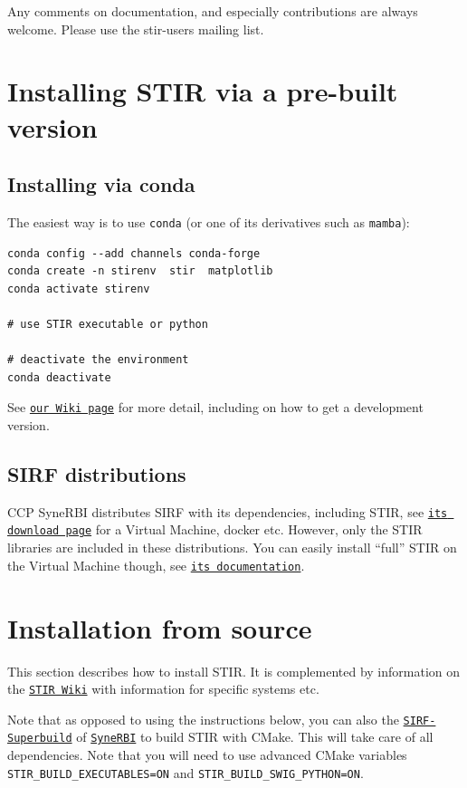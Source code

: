 \documentclass{article}
\def\url#1#2{\mbox{\href{#1}{\tt #2}}}
\begin{document}
Any comments on documentation, and especially contributions are 
always welcome. Please use the stir-users mailing list.

\section{Installing STIR via a pre-built version }
\subsection{
Installing via conda}
The easiest way is to use \texttt{conda} (or one of its derivatives such as \texttt{mamba}):
\begin{verbatim}
conda config --add channels conda-forge
conda create -n stirenv  stir  matplotlib
conda activate stirenv

# use STIR executable or python

# deactivate the environment
conda deactivate
\end{verbatim}
See \url{https://github.com/UCL/STIR/wiki/Installing-STIR-with-conda}{our Wiki page} for
more detail, including on how to get a development version.

\subsection{SIRF distributions}
CCP SyneRBI distributes SIRF with its dependencies, including STIR,
see \url{https://www.ccpsynerbi.ac.uk/downloads/}{its download page} for
a Virtual Machine, docker etc. However, only the STIR libraries are included in
these distributions. You can easily install ``full'' STIR on the Virtual Machine though,
see \url{https://github.com/SyneRBI/SIRF-SuperBuild/blob/master/VirtualBox/documentation/README.md}{its documentation}.

\section{
Installation from source}
This section describes how to install STIR. It is complemented by information on the
\url{http://github.com/UCL/STIR/wiki}{STIR Wiki} with information for specific systems etc.

Note that as opposed to using the instructions below, you can also
the \url{https://github.com/SyneRBI/SIRF-SuperBuild/blob/master/README.md}{SIRF-Superbuild}
of \url{https://www.ccpsynerbi.ac.uk/}{SyneRBI} to build STIR with CMake. This will take care of all dependencies.
Note that you will need to use advanced CMake variables \texttt{STIR\_BUILD\_EXECUTABLES=ON}
and \texttt{STIR\_BUILD\_SWIG\_PYTHON=ON}.
\end{document}
